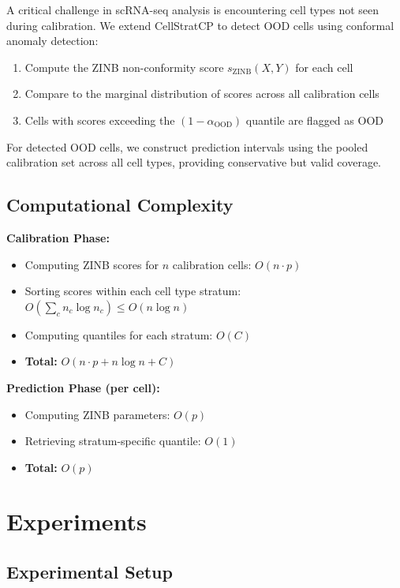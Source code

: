 \documentclass{article}
\begin{document}
A critical challenge in scRNA-seq analysis is encountering cell types not seen during calibration. We extend CellStratCP to detect OOD cells using conformal anomaly detection:

\begin{enumerate}
    \item Compute the ZINB non-conformity score $s_{\text{ZINB}}(X, Y)$ for each cell
    \item Compare to the marginal distribution of scores across all calibration cells
    \item Cells with scores exceeding the $(1-\alpha_{\text{OOD}})$ quantile are flagged as OOD
\end{enumerate}

For detected OOD cells, we construct prediction intervals using the pooled calibration set across all cell types, providing conservative but valid coverage.

\subsection{Computational Complexity}

\textbf{Calibration Phase:}
\begin{itemize}
    \item Computing ZINB scores for $n$ calibration cells: $O(n \cdot p)$
    \item Sorting scores within each cell type stratum: $O(\sum_c n_c \log n_c) \leq O(n \log n)$
    \item Computing quantiles for each stratum: $O(C)$
    \item \textbf{Total:} $O(n \cdot p + n \log n + C)$
\end{itemize}

\textbf{Prediction Phase (per cell):}
\begin{itemize}
    \item Computing ZINB parameters: $O(p)$
    \item Retrieving stratum-specific quantile: $O(1)$
    \item \textbf{Total:} $O(p)$
\end{itemize}

\section{Experiments}

\subsection{Experimental Setup}
\end{document}
